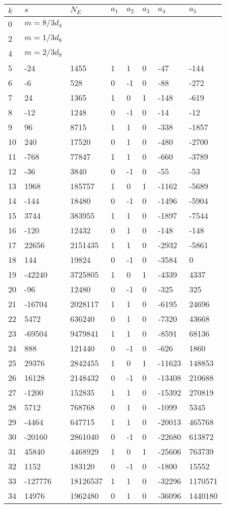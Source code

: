\documentclass{amsart}
\begin{document}
\begin{longtable}{|l|l|l|lllll|}
\hline
$k$ & $s$ & $N_E$ & $a_1$ & $a_2$ & $a_3$ & $a_4$ & $a_5$\\
\hline
0&$m=8/3d_{4}$&&\multicolumn{5}{c|}{}\\
2&$m=1/3d_{8}$&&\multicolumn{5}{c|}{}\\
4&$m=2/3d_{8}$&&\multicolumn{5}{c|}{}\\
5&-24&1455&1&1&0&-47&-144\\
6&-6&528&0&-1&0&-88&-272\\
7&24&1365&1&0&1&-148&-619\\
8&-12&1248&0&-1&0&-14&-12\\
9&96&8715&1&1&0&-338&-1857\\
10&240&17520&0&1&0&-480&-2700\\
11&-768&77847&1&1&0&-660&-3789\\
12&-36&3840&0&-1&0&-55&-53\\
13&1968&185757&1&0&1&-1162&-5689\\
14&-144&18480&0&-1&0&-1496&-5904\\
15&3744&383955&1&1&0&-1897&-7544\\
16&-120&12432&0&1&0&-148&-148\\
17&22656&2151435&1&1&0&-2932&-5861\\
18&144&19824&0&-1&0&-3584&0\\
19&-42240&3725805&1&0&1&-4339&4337\\
20&-96&12480&0&-1&0&-325&325\\
21&-16704&2028117&1&1&0&-6195&24696\\
22&5472&636240&0&1&0&-7320&43668\\
23&-69504&9479841&1&1&0&-8591&68136\\
24&888&121440&0&-1&0&-626&1860\\
25&29376&2842455&1&0&1&-11623&148853\\
26&16128&2148432&0&-1&0&-13408&210688\\
27&-1200&152835&1&1&0&-15392&270819\\
28&5712&768768&0&1&0&-1099&5345\\
29&-4464&647715&1&1&0&-20013&465768\\
30&-20160&2861040&0&-1&0&-22680&613872\\
31&45840&4468929&1&0&1&-25606&763739\\
32&1152&183120&0&-1&0&-1800&15552\\
33&-127776&18126537&1&1&0&-32296&1170571\\
34&14976&1962480&0&1&0&-36096&1440180\\

\end{longtable}
\end{document}
